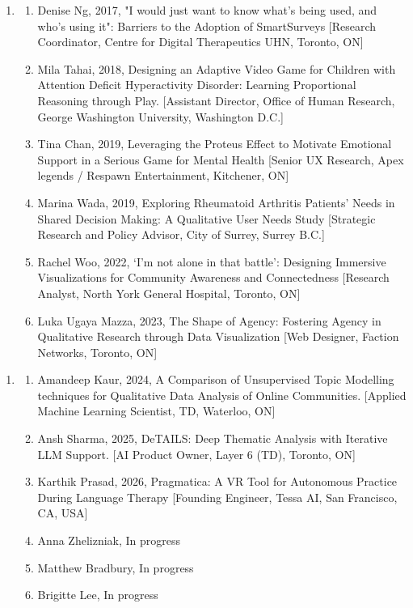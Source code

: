 \documentclass[12pt]{article}
\begin{document}
\begin{enumerate}
    \begin{enumerate}
        \item[MSc]
        \begin{enumerate}[label=\arabic*.]
            \item Denise Ng, 2017,  "I would just want to know what's being used, and who's using it": Barriers to the Adoption of SmartSurveys [Research Coordinator, Centre for Digital Therapeutics \@ UHN, Toronto, ON]
            \item Mila Tahai, 2018, Designing an Adaptive Video Game for Children with Attention Deficit Hyperactivity Disorder: Learning Proportional Reasoning through Play. [Assistant Director, Office of Human Research, George Washington University, Washington D.C.]
            \item Tina Chan, 2019, Leveraging the Proteus Effect to Motivate Emotional Support in a Serious Game for Mental Health [Senior UX Research, Apex legends / Respawn Entertainment, Kitchener, ON]
            \item Marina Wada, 2019, Exploring Rheumatoid Arthritis Patients' Needs in Shared Decision Making: A Qualitative User Needs Study [Strategic Research and Policy Advisor, City of Surrey, Surrey B.C.]
            \item Rachel Woo, 2022, `I'm not alone in that battle': Designing Immersive Visualizations for Community Awareness and Connectedness [Research Analyst, North York General Hospital, Toronto, ON]
            \item Luka Ugaya Mazza, 2023, The Shape of Agency: Fostering Agency in Qualitative Research through Data Visualization [Web Designer, Faction Networks, Toronto, ON]            
        \end{enumerate}
    \end{enumerate}

    \begin{enumerate}
        \item[MMath]
        \begin{enumerate}[label=\arabic*.]
            \item Amandeep Kaur, 2024, A Comparison of Unsupervised Topic Modelling techniques for Qualitative Data Analysis of Online Communities. [Applied Machine Learning Scientist, TD, Waterloo, ON]
            \item Ansh Sharma, 2025, DeTAILS: Deep Thematic Analysis with Iterative LLM Support. [AI Product Owner, Layer 6 (TD), Toronto, ON]
            \item Karthik Prasad, 2026,  Pragmatica:  A VR Tool for Autonomous Practice During Language Therapy [Founding Engineer, Tessa AI, San Francisco, CA, USA]
            \item Anna Zhelizniak, In progress
            \item Matthew Bradbury, In progress
            \item Brigitte Lee, In progress
        \end{enumerate}
    \end{enumerate}


\end{enumerate}
\end{document}
